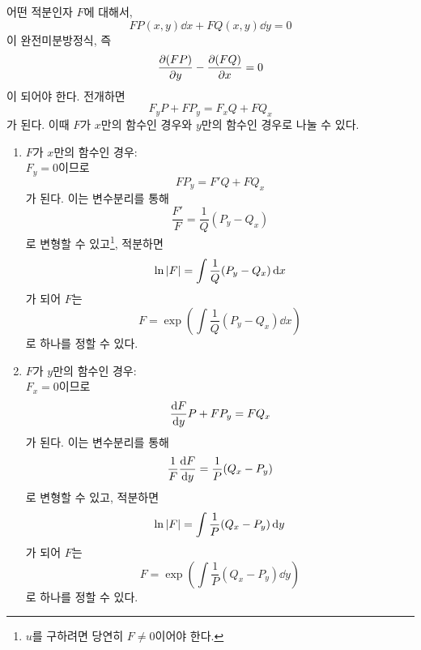 \documentclass[../engineering_mathematics_lecture_note.tex]{subfiles}
\begin{document}
어떤 적분인자 $F$에 대해서,
\begin{equation*}
    FP(x, y) \dd{x} + FQ(x, y) \dd{y} = 0
\end{equation*}
이 완전미분방정식, 즉
\begin{equation*}
    \pdv{(FP)}{y} - \pdv{(FQ)}{x} = 0
\end{equation*}
이 되어야 한다.
전개하면
\begin{equation*}
    F_y P + FP_y = F_x Q + FQ_x
\end{equation*}
가 된다.
이때 $F$가 $x$만의 함수인 경우와 $y$만의 함수인 경우로 나눌 수 있다.
\begin{enumerate}
    \item $F$가 $x$만의 함수인 경우:\\
        $F_y = 0$이므로
        \begin{equation*}
            FP_y = F'Q + FQ_x
        \end{equation*}
        가 된다.
        이는 변수분리를 통해
        \begin{equation*}
            \frac{F'}{F} = \frac 1Q (P_y - Q_x)
        \end{equation*}
        로 변형할 수 있고\footnote{$u$를 구하려면 당연히 $F \neq 0$이어야 한다.}, 적분하면
        \begin{equation*}
            \ln \abs{F} = \int{\frac 1Q (P_y - Q_x) \dd{x}}
        \end{equation*}
        가 되어 $F$는
        \begin{equation*}
            F = \exp(\int{\frac 1Q (P_y - Q_x) \dd{x}})
        \end{equation*}
        로 하나를 정할 수 있다.
    \item $F$가 $y$만의 함수인 경우:\\
        $F_x = 0$이므로
        \begin{equation*}
            \dv{F}{y} P + FP_y = FQ_x
        \end{equation*}
        가 된다.
        이는 변수분리를 통해
        \begin{equation*}
            \frac{1}{F} \dv{F}{y} = \frac 1P (Q_x - P_y)
        \end{equation*}
        로 변형할 수 있고, 적분하면
        \begin{equation*}
            \ln \abs{F} = \int{\frac 1P (Q_x - P_y) \dd{y}}
        \end{equation*}
        가 되어 $F$는
        \begin{equation*}
            F = \exp(\int{\frac 1P (Q_x - P_y) \dd{y}})
        \end{equation*}
        로 하나를 정할 수 있다.
\end{enumerate}
\end{document}

